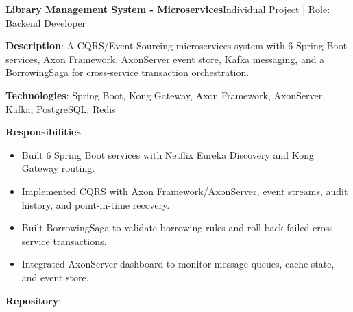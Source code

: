   \resumeProjectHeading
    {\textbf{Library Management System - Microservices}}{Individual Project | Role: Backend Developer}
    \resumeItemListStart
      \item \textbf{Description}: A CQRS/Event Sourcing microservices system with 6 Spring Boot services, Axon Framework,
        AxonServer event store, Kafka messaging, and a BorrowingSaga for cross-service transaction orchestration.
      \item \textbf{Technologies}: Spring Boot, Kong Gateway, Axon Framework, AxonServer, Kafka, PostgreSQL, Redis
      \item \textbf{Responsibilities}
        \begin{itemize}
          \item Built 6 Spring Boot services with Netflix Eureka Discovery and Kong Gateway routing.
          \item Implemented CQRS with Axon Framework/AxonServer, event streams, audit history, and point-in-time recovery.
          \item Built BorrowingSaga to validate borrowing rules and roll back failed cross-service transactions.
          \item Integrated AxonServer dashboard to monitor message queues, cache state, and event store.
        \end{itemize}
      \item \textbf{Repository}: \href{https://github.com/nvminh162/backend-library-system}{}
    \resumeItemListEnd

\resumeSubHeadingListEnd
